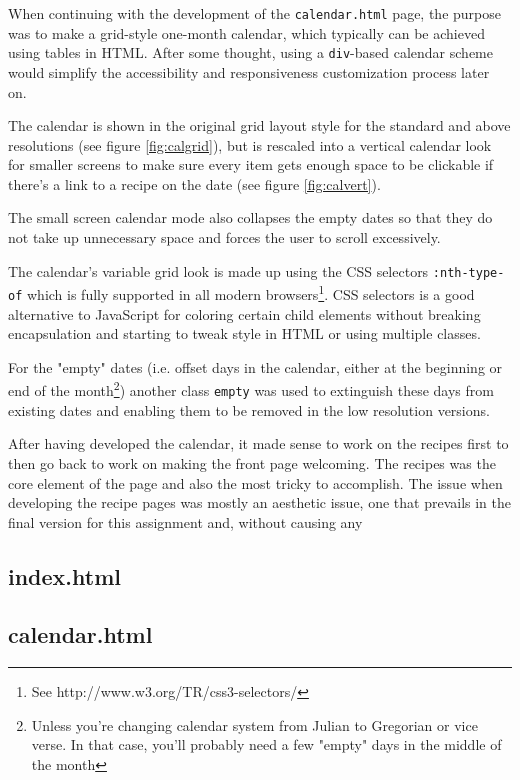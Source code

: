 \documentclass[a4paper]{scrartcl}
\begin{document}
When continuing with the development of the \texttt{calendar.html} page, the purpose was to make a grid-style one-month calendar, which typically can be achieved using tables in HTML. After some thought, using a \texttt{div}-based calendar scheme would simplify the accessibility and responsiveness customization process later on.

The calendar is shown in the original grid layout style for the standard and above resolutions (see figure \ref{fig:calgrid}), but is rescaled into a vertical calendar look for smaller screens to make sure every item gets enough space to be clickable if there's a link to a recipe on the date (see figure \ref{fig:calvert}).

The small screen calendar mode also collapses the empty dates so that they do not take up unnecessary space and forces the user to scroll excessively.

The calendar's variable grid look is made up using the CSS selectors \texttt{:nth-type-of} which is fully supported in all modern browsers\footnote{See http://www.w3.org/TR/css3-selectors/}. CSS selectors is a good alternative to JavaScript for coloring certain child elements without breaking encapsulation and starting to tweak style in HTML or using multiple classes.

For the "empty" dates (i.e. offset days in the calendar, either at the beginning or end of the month\footnote{Unless you're changing calendar system from Julian to Gregorian or vice verse. In that case, you'll probably need a few "empty" days in the middle of the month}) another class \texttt{empty} was used to extinguish these days from existing dates and enabling them to be removed in the low resolution versions.


After having developed the calendar, it made sense to work on the recipes first to then go back to work on making the front page welcoming. The recipes was the core element of the page and also the most tricky to accomplish.
The issue when developing the recipe pages was mostly an aesthetic issue, one that prevails in the final version for this assignment and, without causing any 

\subsection{index.html}


\subsection{calendar.html}

\end{document}
